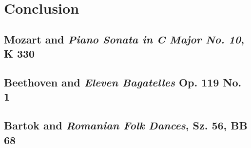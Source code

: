 \chapter*{Conclusion}\label{conclusion}

\section*{Mozart and \textit{Piano Sonata in C Major No. 10}, K 330}

\section*{Beethoven and \textit{Eleven Bagatelles} Op. 119 No. 1}

\section*{Bartok and \textit{Romanian Folk Dances}, Sz. 56, BB 68}




